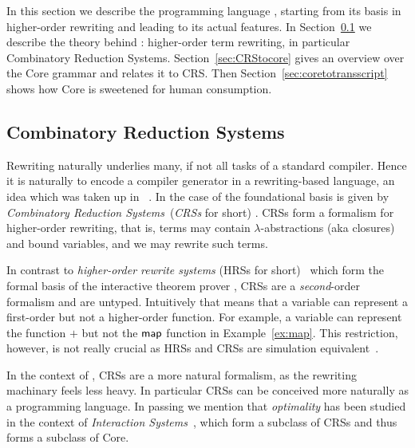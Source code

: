 In this section we describe the programming language \Tosca, starting
from its basis in higher-order rewriting and leading to its actual features.
%
In Section~\ref{sec:CRS} we describe the theory behind \Tosca:
higher-order term rewriting, in particular Combinatory Reduction
Systems. 
Section~\ref{sec:CRStocore} gives an overview over the
\Tosca Core grammar and relates it to CRS. Then
Section~\ref{sec:coretotransscript} shows how \Tosca Core 
is sweetened for human consumption.

\subsection{Combinatory Reduction Systems} \label{sec:CRS}

Rewriting naturally underlies many, if not all tasks of a standard
compiler. Hence it is naturally to encode a compiler 
generator in a rewriting-based language, an idea which was
taken up in \crsx~\cite{2010_rose, 2011_rose}.
 In the case of \Tosca the foundational basis is given by \emph{Combinatory
  Reduction Systems}~(\emph{CRSs} for short)
\cite{Aczel:78,1980_klop}.  CRSs form a formalism for higher-order
rewriting, that is, terms may contain $\lambda$-abstractions (aka
closures) and bound variables, and we may rewrite such terms.

In contrast to \emph{higher-order rewrite systems} (HRSs for short)~\cite{1998_mayr-nipkow} 
which form the formal basis of the interactive theorem prover \Isabelle, CRSs are
a \emph{second}-order formalism and are untyped.
Intuitively that means that a variable can represent a
first-order but not a higher-order function. For example, a variable
can represent the function $\plus$ but not the $\mathsf{map}$ function in
Example~\ref{ex:map}.
This restriction, however, is not really crucial as HRSs and CRSs are simulation
equivalent~\cite{2003_van_raamsdonk}.

In the context of \Tosca, CRSs are a more natural formalism, as the 
rewriting machinary feels less heavy. In particular CRSs can be conceived
more naturally as a programming language. In passing we mention that
\emph{optimality} has been studied in the context of \emph{Interaction Systems}~\cite{AG:98},
which form a subclass of CRSs and thus forms a subclass of \Tosca Core.

